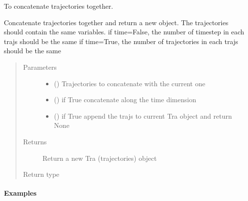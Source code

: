 \documentclass[a4paper,10pt,english]{sphinxmanual}
\begin{document}
\begin{fulllineitems}

\begin{fulllineitems}
\label{\detokenize{lagranto:lagranto.Tra.concatenate}}
To concatenate trajectories together.

Concatenate trajectories together and return a new object.
The trajectories should contain the same variables.
if time=False, the number of timestep in each trajs should be the same
if time=True, the number of trajectories in each trajs should be the same
\begin{quote}\begin{description}
\item[{Parameters}] \leavevmode\begin{itemize}
\item {} 
 ({\hyperref[\detokenize{lagranto:lagranto.Tra}]{}}) \textendash{} Trajectories to concatenate with the current one

\item {} 
 (\sphinxstyleliteralemphasis{, }) \textendash{} if True concatenate along the time dimension

\item {} 
 (\sphinxstyleliteralemphasis{, }) \textendash{} if True append the trajs to current Tra object and return None

\end{itemize}

\item[{Returns}] \leavevmode
Return a new Tra (trajectories) object

\item[{Return type}] \leavevmode
{\hyperref[\detokenize{lagranto:lagranto.Tra}]{}}

\end{description}\end{quote}
\paragraph{Examples}


\end{fulllineitems}
\end{fulllineitems}
\end{document}
